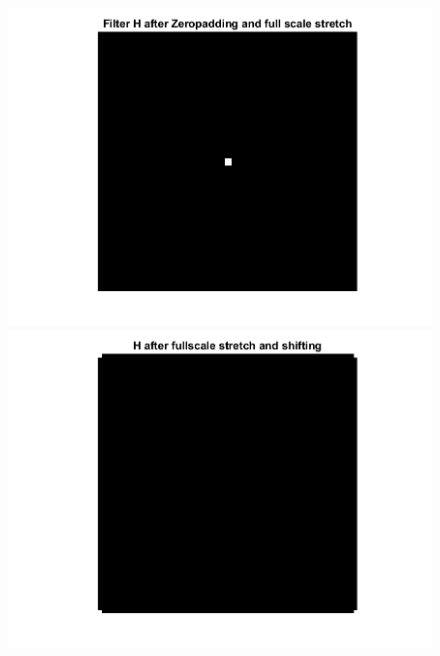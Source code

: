 \documentclass[11pt]{article} %
\begin{document}
\begin{figure}
 \centering
	\includegraphics{1cc.png}
	\includegraphics{1cd.png}
\end{figure}
\end{document}
